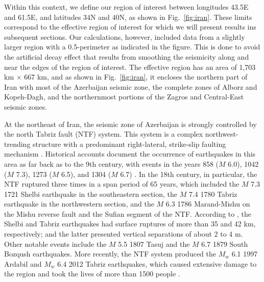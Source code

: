 Within this context, we define our region of interest between longitudes 43.5\textdegree{}E and 61.5\textdegree{}E, and latitudes 34\textdegree{}N and 40\textdegree{}N, as shown in Fig.~\ref{fig:iran}. These limits correspond to the effective region of interest for which we will present results ins subsequent sections. Our calculations, however, included data from a slightly larger region with a 0.5\textdegree{}-perimeter as indicated in the figure. This is done to avoid the artificial decay effect that results from smoothing the seismicity along and near the edges of the region of interest. The effective region has an area of 1,703 km $\times$ 667 km, and as shown in Fig.~\ref{fig:iran}, it encloses the northern part of Iran with most of the Azerbaijan seismic zone, the complete zones of Alborz and Kopeh-Dagh, and the northernmost portions of the Zagros and Central-East seismic zones.

At the northeast of Iran, the seismic zone of Azerbaijan is strongly controlled by the north Tabriz fault (NTF) system. This system is a complex northwest-trending structure with a predominant right-lateral, str\-ike-slip faulting mechanism \citep{Berberian1999}. Historical accounts document the occurrence of earthquakes in this area as far back as to the 9th century, with events in the years 858 ($M$ 6.0), 1042 ($M$ 7.3), 1273 ($M$ 6.5), and 1304 ($M$ 6.7) \citep{Berberian1999}. In the 18th century, in particular, the NTF ruptured three times in a span period of 65 years, which included the $M$ 7.3 1721 Shelbi earthquake in the southeastern section, the $M$ 7.4 1780 Tabriz earthquake in the northwestern section, and the $M$ 6.3 1786 Marand-Mishu on the Mishu reverse fault and the Sufian segment of the NTF. According to \citet{Jones1834}, the Shelbi and Tabriz earthquakes had surface ruptures of more than 35 and 42 km, respectively; and the latter presented vertical separations of about 2 to 4 m. Other notable events include the $M$ 5.5 1807 Tasuj and the $M$ 6.7 1879 South Bozqush earthquakes. More recently, the NTF system produced the $M_w$ 6.1 1997 Ardabil and $M_w$ 6.4 2012 Tabriz earthquakes, which caused extensive damage to the region and took the lives of more than 1500 people \citep{USGS_ardabil,USGS_tabriz}.

